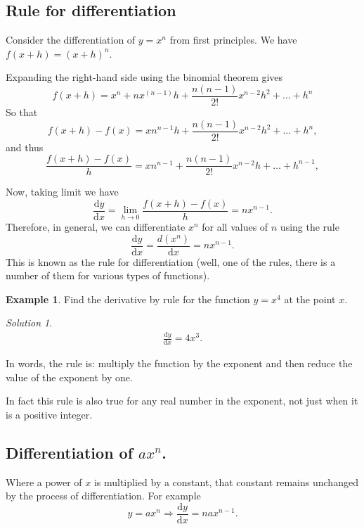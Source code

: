 \documentclass[
  11pt,
  oneside]{book}
\newcommand{\slide}{}
\theoremstyle{definition}
\theoremstyle{definition}
\newtheorem{example}{Example}[chapter]
\theoremstyle{definition}
\theoremstyle{definition}
\theoremstyle{remark}
\newtheorem*{solution}{Solution}
\begin{document}
\slide

\subsection{Rule for differentiation}\label{rule-for-differentiation}

Consider the differentiation of \(y = x^n\) from first principles. We have \(f(x+h) = (x + h)^n\).

Expanding the right-hand side using the binomial theorem gives
\[
f(x+h) = x^n + nx^{(n-1)}h+\frac{n(n-1)}{2!}x^{n-2}h^2+\ldots+h^n
\]
So that
\[
f(x+h)-f(x) = xn^{n-1}h+\frac{n(n-1)}{2!}x^{n-2}h^2+\ldots + h^n,
\]
and thus
\[
\frac{f(x+h)-f(x)}{h} = xn^{n-1}+\frac{n(n-1)}{2!}x^{n-2}h+\ldots + h^{n-1},
\]
\slide
Now, taking limit we have
\[
\frac{\mathrm{d} y}{\mathrm{d} x} = \lim\limits_{h\to0}\frac{f(x+h)-f(x)}{h} = nx^{n-1}.
\]
Therefore, in general, we can differentiate \(x^n\) for all values of \(n\) using the rule
\[
\frac{\mathrm{d} y}{\mathrm{d} x} = \frac{d(x^n)}{\mathrm{d} x} = nx^{n-1}.
\]
This is known as the rule for differentiation (well, one of the rules, there is a number of them for various types of functions).
\slide

\begin{example}
Find the derivative by rule for the function \(y = x^4\) at the point \(x\).
\end{example}

\begin{solution}
\begin{gather*}
\frac{\mathrm{d} y}{\mathrm{d} x} = 4x^3.
\end{gather*}
\end{solution}

In words, the rule is: multiply the function by the exponent and then reduce the value of the exponent by one.

In fact this rule is also true for any real number in the exponent, not just when it is a positive integer.

\slide

\subsection{\texorpdfstring{Differentiation of \(ax^n\).}{Differentiation of ax\^{}n.}}\label{differentiation-of-axn.}

Where a power of \(x\) is multiplied by a constant, that constant remains unchanged by the process of differentiation. For example
\[
y = ax^n \Rightarrow \frac{\mathrm{d} y}{\mathrm{d} x} = nax^{n-1}.
\]
\end{document}
